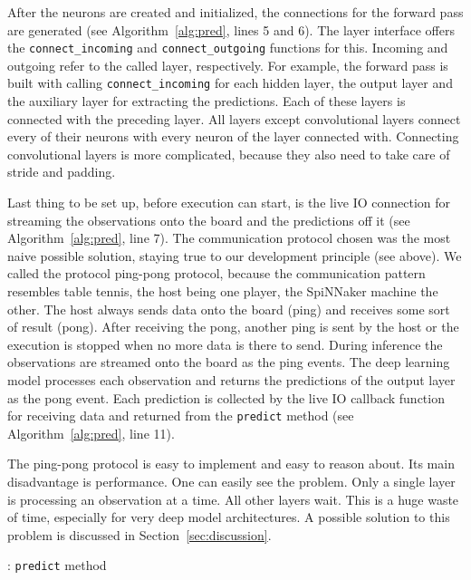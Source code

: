 \documentclass[]{article}
\begin{document}
After the neurons are created and initialized, the connections for
the forward pass are generated (see Algorithm~\ref{alg:pred}, lines 5
and 6).
The layer interface offers the \texttt{connect\_incoming} and
\texttt{connect\_outgoing} functions for this.
Incoming and outgoing refer to the called layer, respectively.
For example, the forward pass is built with calling
\texttt{connect\_incoming} for each hidden layer, the output layer
and the auxiliary layer for extracting the predictions.
Each of these layers is connected with the preceding layer.
All layers except convolutional layers connect every of their neurons
with every neuron of the layer connected with.
Connecting convolutional layers is more complicated, because they
also need to take care of stride and padding.

Last thing to be set up, before execution can start, is the live IO
connection for streaming the observations onto the board and the
predictions off it (see Algorithm~\ref{alg:pred}, line 7).
The communication protocol chosen was the most naive possible
solution, staying true to our development principle (see above).
We called the protocol ping-pong protocol, because the communication
pattern resembles table tennis, the host being one player, the
SpiNNaker machine the other.
The host always sends data onto the board (ping) and receives some
sort of result (pong).
After receiving the pong, another ping is sent by the host or the
execution is stopped when no more data is there to send.
During inference the observations are streamed onto the board as the
ping events.
The deep learning model processes each observation and returns the
predictions of the output layer as the pong event.
Each prediction is collected by the live IO callback function for
receiving data and returned from the \texttt{predict} method
(see Algorithm~\ref{alg:pred}, line 11).

The ping-pong protocol is easy to implement and easy to reason about.
Its main disadvantage is performance.
One can easily see the problem.
Only a single layer is processing an observation at a time.
All other layers wait.
This is a huge waste of time, especially for very deep model
architectures.
A possible solution to this problem is discussed in
Section~\ref{sec:discussion}.

\begin{algorithm} %
  \caption{: \texttt{predict} method}
  \label{alg:pred}

  \begin{algorithmic}[1]
  \end{algorithmic}
\end{algorithm} %
\end{document}

